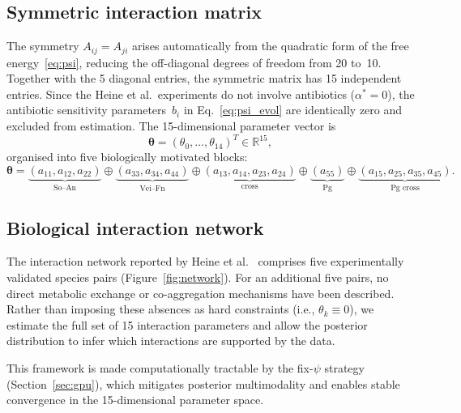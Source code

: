 \documentclass[11pt,a4paper]{article}
\newcommand{\btheta}{\boldsymbol{\theta}}
\newcommand{\Real}{\mathbb{R}}
\begin{document}
\subsection{Symmetric interaction matrix}
\label{sec:model_matrix}

The symmetry $A_{ij}=A_{ji}$ arises automatically from the quadratic form of the free energy~\eqref{eq:psi}, reducing the off-diagonal degrees of freedom from 20 to~10.
Together with the 5 diagonal entries, the symmetric matrix has 15 independent entries.
Since the Heine et al.\ experiments do not involve antibiotics ($\alpha^*=0$), the antibiotic sensitivity parameters~$b_i$ in Eq.~\eqref{eq:psi_evol} are identically zero and excluded from estimation.
The 15-dimensional parameter vector is
\begin{equation}
\btheta = (\theta_0,\dots,\theta_{14})^T \in \Real^{15},
\label{eq:theta}
\end{equation}
organised into five biologically motivated blocks:
\begin{equation}
\btheta =
\underbrace{(a_{11},a_{12},a_{22})}_{\text{So--An}}
\oplus
\underbrace{(a_{33},a_{34},a_{44})}_{\text{Vei--Fn}}
\oplus
\underbrace{(a_{13},a_{14},a_{23},a_{24})}_{\text{cross}}
\oplus
\underbrace{(a_{55})}_{\text{Pg}}
\oplus
\underbrace{(a_{15},a_{25},a_{35},a_{45})}_{\text{Pg cross}}.
\label{eq:blocks}
\end{equation}

\subsection{Biological interaction network}

The interaction network reported by Heine et al.~\cite{Heine2025PeriImplant} comprises five experimentally validated species pairs (Figure~\ref{fig:network}).
For an additional five pairs, no direct metabolic exchange or co-aggregation mechanisms have been described. Rather than imposing these absences as hard constraints (i.e., $\theta_k\equiv0$), we estimate the full set of 15 interaction parameters and allow the posterior distribution to infer which interactions are supported by the data.

This framework is made computationally tractable by the fix-$\psi$ strategy (Section~\ref{sec:gpu}), which mitigates posterior multimodality and enables stable convergence in the 15-dimensional parameter space.
\end{document}
